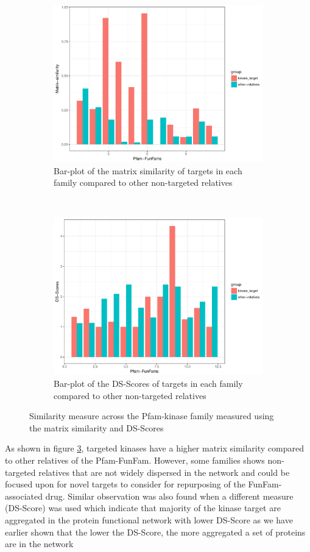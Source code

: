 \documentclass[a4paper, 11pt]{report}
\begin{document}
\begin{figure}[H]
\centering
\begin{subfigure}{0.8\textwidth}
  \centering
  \includegraphics[width=0.9\linewidth]{figures/pfam_sim0910.pdf}
  \caption{Bar-plot of the matrix similarity of targets in each family compared to other non-targeted relatives}
  \label{sim_plot}
\end{subfigure}\\
\begin{subfigure}{0.8\textwidth}
  \includegraphics[width=0.9\linewidth]{figures/pfamds_plot.pdf}
	\centering
	\caption{Bar-plot of the DS-Scores of targets in each family compared to other non-targeted relatives}
	\label{ds_plot}
\end{subfigure}
\caption{Similarity measure across the Pfam-kinase family measured using the matrix similarity and DS-Scores}
\label{pfam_sim}
\end{figure}
As shown in figure \ref{pfam_sim}, targeted kinases have a higher matrix similarity compared to other relatives of the Pfam-FunFam. However, some families shows non-targeted relatives that are not widely dispersed in the network and could be focused upon for novel targets to consider for repurposing of the FunFam-associated drug. Similar observation was also found when a different measure (DS-Score) was used which indicate that majority of the kinase target are aggregated in the protein functional network with lower DS-Score as we have earlier shown that the lower the DS-Score, the more aggregated a set of proteins are in the network  \cite{menche2015uncovering}
\end{document}
